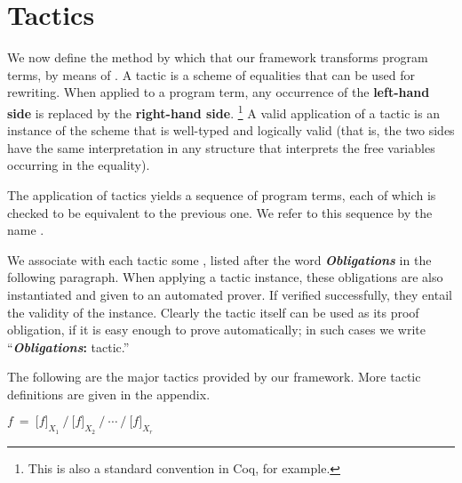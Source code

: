 \section{Tactics}
\label{tactics}

We now define the method by which that our framework transforms program terms, by means of .
A tactic is a scheme of equalities that can be used for rewriting.
When applied to a program term, any occurrence of the {\bf left-hand side} is replaced by the {\bf right-hand side}.%
\footnote{This is also a standard convention in Coq, for example.}
A valid application of a tactic is an instance of the scheme that is well-typed and logically valid
(that is, the two sides have the same interpretation in any structure that interprets the free
variables occurring in the equality).

The application of tactics yields a sequence of program terms, each of which is checked to
be equivalent to the previous one. We refer to this sequence by the name .

We associate with each tactic some , listed after the word \textbf{\textit{Obligations}}
in the following paragraph.
When applying a tactic instance, these obligations are also instantiated and given to an automated prover. 
If verified successfully, they entail the validity of the instance. 
Clearly the tactic itself can be used as its proof obligation, if it is easy enough to prove automatically; 
in such cases we write ``\textbf{\textit{Obligations}:} tactic.''

The following are the major tactics provided by our framework. 
More tactic definitions are given in the appendix.

\newcommand\Obligations{\medskip\noindent\textbf{\textit{Obligations}:} }
\newcommand\reduce{\operatorname{reduce}}
\newcommand\listConcat{{\scriptstyle \,++\,}}

\theoremstyle{definition}
\newtheorem{tactic}{Tactic}

\newcommand\tacticdef[1]{\subsection*{\sf\larger #1}\vspace{-3mm}}
\newcommand\tacticdefcompact[1]{\medskip\noindent{\sf\larger #1}\medskip\hfill}

\tacticdefcompact{Slice} \label{tactics:Slice}
$f ~=~ \big[f\big]_{X_1} ~\Big/~ \big[f\big]_{X_2} ~\Big/ ~\cdots~ \Big/~ \big[f\big]_{X_r}$\hspace{10mm}

